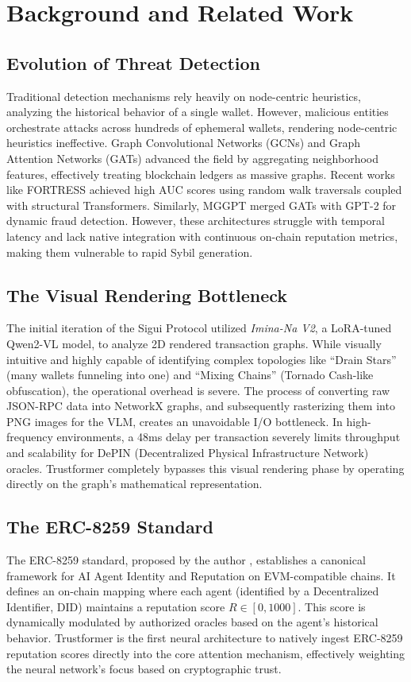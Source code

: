 \documentclass[conference,10pt]{IEEEtran}
\begin{document}
\section{Background and Related Work}

\subsection{Evolution of Threat Detection}
Traditional detection mechanisms rely heavily on node-centric heuristics, analyzing the historical behavior of a single wallet. However, malicious entities orchestrate attacks across hundreds of ephemeral wallets, rendering node-centric heuristics ineffective. Graph Convolutional Networks (GCNs) and Graph Attention Networks (GATs) advanced the field by aggregating neighborhood features, effectively treating blockchain ledgers as massive graphs. Recent works like FORTRESS \cite{fortress2025} achieved high AUC scores using random walk traversals coupled with structural Transformers. Similarly, MGGPT \cite{mggpt2025} merged GATs with GPT-2 for dynamic fraud detection. However, these architectures struggle with temporal latency and lack native integration with continuous on-chain reputation metrics, making them vulnerable to rapid Sybil generation.

\subsection{The Visual Rendering Bottleneck}
The initial iteration of the Sigui Protocol utilized \textit{Imina-Na V2}, a LoRA-tuned Qwen2-VL model, to analyze 2D rendered transaction graphs. While visually intuitive and highly capable of identifying complex topologies like ``Drain Stars'' (many wallets funneling into one) and ``Mixing Chains'' (Tornado Cash-like obfuscation), the operational overhead is severe. The process of converting raw JSON-RPC data into NetworkX graphs, and subsequently rasterizing them into PNG images for the VLM, creates an unavoidable I/O bottleneck. In high-frequency environments, a 48ms delay per transaction severely limits throughput and scalability for DePIN (Decentralized Physical Infrastructure Network) oracles. Trustformer completely bypasses this visual rendering phase by operating directly on the graph's mathematical representation.

\subsection{The ERC-8259 Standard}
The ERC-8259 standard, proposed by the author \cite{erc8259}, establishes a canonical framework for AI Agent Identity and Reputation on EVM-compatible chains. It defines an on-chain mapping where each agent (identified by a Decentralized Identifier, DID) maintains a reputation score $R \in [0, 1000]$. This score is dynamically modulated by authorized oracles based on the agent's historical behavior. Trustformer is the first neural architecture to natively ingest ERC-8259 reputation scores directly into the core attention mechanism, effectively weighting the neural network's focus based on cryptographic trust.
\end{document}
